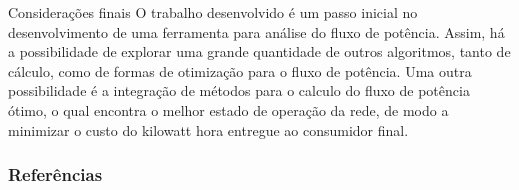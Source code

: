 \documentclass[10pt]{beamer}
\begin{document}
\begin{frame}{Considerações finais}
    O trabalho desenvolvido é um passo inicial no desenvolvimento de uma ferramenta para análise do fluxo de potência. Assim, há a possibilidade de explorar uma grande quantidade de outros algoritmos, tanto de cálculo, como de formas de otimização para o fluxo de potência.
    Uma outra possibilidade é a integração de métodos para o calculo do fluxo de potência ótimo, o qual encontra o melhor estado de operação da rede, de modo a minimizar o custo do kilowatt hora entregue ao consumidor final.
\end{frame}

\begin{frame}[allowframebreaks]

  \frametitle{Referências}

  
  

\end{frame}


\end{document}
